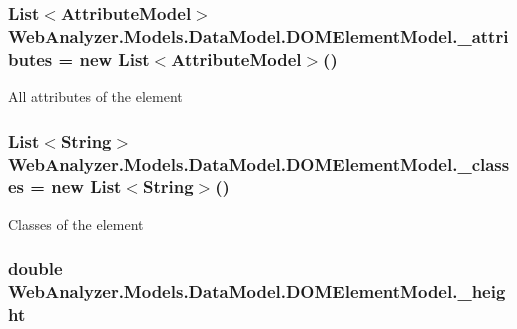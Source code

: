 \subsubsection[{\+\_\+attributes}]{\setlength{\rightskip}{0pt plus 5cm}List$<${\bf Attribute\+Model}$>$ Web\+Analyzer.\+Models.\+Data\+Model.\+D\+O\+M\+Element\+Model.\+\_\+attributes = new List$<${\bf Attribute\+Model}$>$()\hspace{0.3cm}{\ttfamily [private]}}\label{class_web_analyzer_1_1_models_1_1_data_model_1_1_d_o_m_element_model_ac907634afc4fec9be436d2ad08865246}


All attributes of the element 

\hypertarget{class_web_analyzer_1_1_models_1_1_data_model_1_1_d_o_m_element_model_a6df986d1bb481e6aba1ab17c5f6c2fce}{}
\subsubsection[{\+\_\+classes}]{\setlength{\rightskip}{0pt plus 5cm}List$<$String$>$ Web\+Analyzer.\+Models.\+Data\+Model.\+D\+O\+M\+Element\+Model.\+\_\+classes = new List$<$String$>$()\hspace{0.3cm}{\ttfamily [private]}}\label{class_web_analyzer_1_1_models_1_1_data_model_1_1_d_o_m_element_model_a6df986d1bb481e6aba1ab17c5f6c2fce}


Classes of the element 

\hypertarget{class_web_analyzer_1_1_models_1_1_data_model_1_1_d_o_m_element_model_a271887d24b632402d029618d0a208cfe}{}
\subsubsection[{\+\_\+height}]{\setlength{\rightskip}{0pt plus 5cm}double Web\+Analyzer.\+Models.\+Data\+Model.\+D\+O\+M\+Element\+Model.\+\_\+height\hspace{0.3cm}{\ttfamily [private]}}\label{class_web_analyzer_1_1_models_1_1_data_model_1_1_d_o_m_element_model_a271887d24b632402d029618d0a208cfe}



